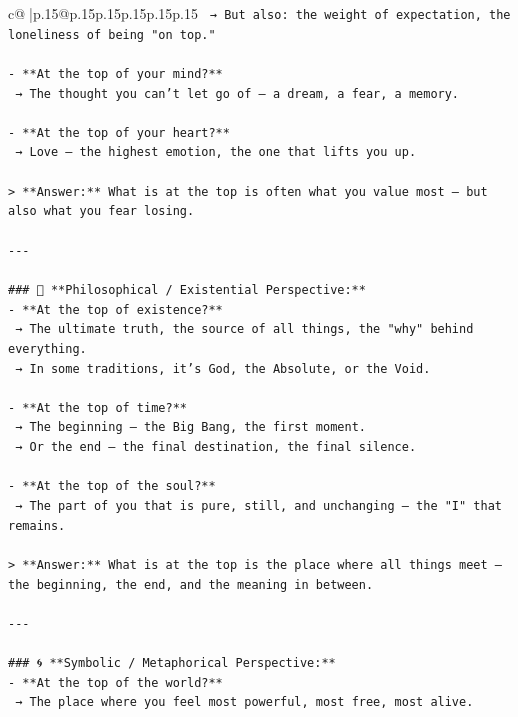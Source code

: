 \documentclass{article}
\begin{document}
{\begin{supertabular}{c@{$\;$}|p{.15\linewidth}@{}p{.15\linewidth}p{.15\linewidth}p{.15\linewidth}p{.15\linewidth}p{.15\linewidth}}
{{{\texttt{  → But also: the weight of expectation, the loneliness of being "on top."} \\
\\ 
\texttt{{-} **At the top of your mind?**  } \\
\texttt{  → The thought you can’t let go of — a dream, a fear, a memory.} \\
\\ 
\texttt{{-} **At the top of your heart?**  } \\
\texttt{  → Love — the highest emotion, the one that lifts you up.} \\
\\ 
\texttt{> **Answer:** What is at the top is often what you value most — but also what you fear losing.} \\
\\ 
\texttt{{-}{-}{-}} \\
\\ 
\texttt{\#\#\# 🌌 **Philosophical / Existential Perspective:**} \\
\texttt{{-} **At the top of existence?**  } \\
\texttt{  → The ultimate truth, the source of all things, the "why" behind everything.  } \\
\texttt{  → In some traditions, it’s God, the Absolute, or the Void.} \\
\\ 
\texttt{{-} **At the top of time?**  } \\
\texttt{  → The beginning — the Big Bang, the first moment.  } \\
\texttt{  → Or the end — the final destination, the final silence.} \\
\\ 
\texttt{{-} **At the top of the soul?**  } \\
\texttt{  → The part of you that is pure, still, and unchanging — the "I" that remains.} \\
\\ 
\texttt{> **Answer:** What is at the top is the place where all things meet — the beginning, the end, and the meaning in between.} \\
\\ 
\texttt{{-}{-}{-}} \\
\\ 
\texttt{\#\#\# 🌀 **Symbolic / Metaphorical Perspective:**} \\
\texttt{{-} **At the top of the world?**  } \\
\texttt{  → The place where you feel most powerful, most free, most alive.  } \\
}}}
\end{supertabular}}
\end{document}
